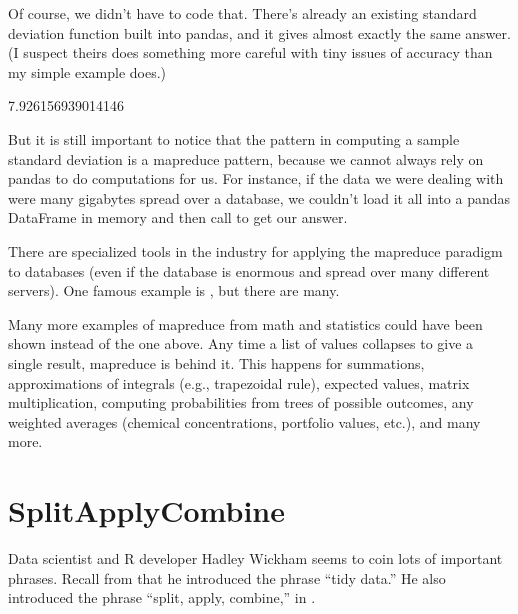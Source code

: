 \documentclass[letterpaper,10pt,english]{jupyterBook}
\begin{document}
\sphinxAtStartPar
Of course, we didn’t have to code that.  There’s already an existing standard deviation function built into pandas, and it gives almost exactly the same answer.  (I suspect theirs does something more careful with tiny issues of accuracy than my simple example does.)

\begin{sphinxVerbatim}[commandchars=\\\{\}]
\end{sphinxVerbatim}

\begin{sphinxVerbatim}[commandchars=\\\{\}]
7.926156939014146
\end{sphinxVerbatim}

\sphinxAtStartPar
But it is still important to notice that the pattern in computing a sample standard deviation is a map\sphinxhyphen{}reduce pattern, because we cannot always rely on pandas to do computations for us.  For instance, if the data we were dealing with were many gigabytes spread over a database, we couldn’t load it all into a pandas DataFrame in memory and then call  to get our answer.

\sphinxAtStartPar
There are specialized tools in the industry for applying the map\sphinxhyphen{}reduce paradigm to databases (even if the database is enormous and spread over many different servers).  One famous example is , but there are many.

\sphinxAtStartPar
Many more examples of map\sphinxhyphen{}reduce from math and statistics could have been shown instead of the one above.  Any time a list of values collapses to give a single result, map\sphinxhyphen{}reduce is behind it.  This happens for summations, approximations of integrals (e.g., trapezoidal rule), expected values, matrix multiplication, computing probabilities from trees of possible outcomes, any weighted averages (chemical concentrations, portfolio values, etc.), and many more.


\section{Split\sphinxhyphen{}Apply\sphinxhyphen{}Combine}
\label{\detokenize{chapter-11-processing-rows:split-apply-combine}}
\sphinxAtStartPar
Data scientist and R developer Hadley Wickham seems to coin lots of important phrases.  Recall from {\hyperref[\detokenize{chapter-5-before-and-after::doc}]{}} that he introduced the phrase “tidy data.”  He also introduced the phrase “split, apply, combine,” in .
\end{document}
